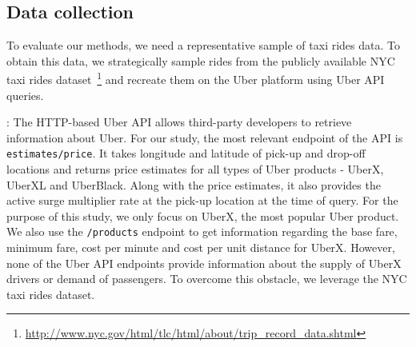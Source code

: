 



\iffalse
\subsection{Data collection}
\label{sec:data}
To evaluate our methods, we need a representative sample of taxi rides data. To obtain this data, we strategically sample rides from the publicly available NYC taxi rides 
dataset~\footnote{\url{http://www.nyc.gov/html/tlc/html/about/trip_record_data.shtml}} and recreate them on the Uber platform using Uber API queries.

: 
The HTTP-based Uber API allows third-party developers to retrieve information about Uber. For our study, the most relevant endpoint of the API is \texttt{estimates/price}. It takes longitude and latitude of pick-up and drop-off locations and returns price estimates for all types of Uber products - UberX, UberXL and UberBlack. Along with the price estimates, it also provides the active surge multiplier rate at the pick-up location at the time of query. For the purpose of this study, we only focus on UberX, the most popular Uber product. We also use the \texttt{/products} endpoint to get information regarding the base fare, minimum fare, cost per minute and cost per unit distance for UberX. However, none of the Uber API endpoints provide information about the supply of UberX drivers or demand of passengers. To overcome this obstacle, we leverage the NYC taxi rides dataset.

